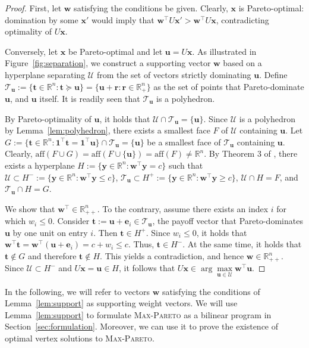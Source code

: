 \documentclass[a4paper, 11pt]{article}
\newcommand{\mc}{\mathcal}
\begin{document}
\begin{proof}
First, let $\bm{w}$ satisfying the conditions be given. Clearly, $\bm{x}$ is Pareto-optimal: domination by some $\bm{x}'$ would imply that $\bm{w}^\top U \bm{x}' > \bm{w}^\top U \bm{x}$, contradicting optimality of $U \bm{x}$.

Conversely, let $\bm{x}$ be Pareto-optimal and let $\bm{u} = U \bm{x}$. As illustrated in Figure~\ref{fig:separation}, we construct a supporting vector $\bm{w}$ based on a hyperplane separating $\mc{U}$ from the set of vectors strictly dominating $\bm{u}$. Define $\mc{T}_{\bm{u}} := \{ \bm{t} \in \mathbb{R}^n : \bm{t} \succeq \bm{u} \} = \{ \bm{u} + \bm{r} : \bm{r} \in \mathbb{R}^{n}_{+}\}$ as the set of points that Pareto-dominate $\bm{u}$, and $\bm{u}$ itself. It is readily seen that $\mc{T}_{\bm{u}}$ is a polyhedron.



By Pareto-optimality of $\bm{u}$, it holds that $\mc{U} \cap \mc{T}_{\bm{u}} = \{ \bm{u} \}$. Since $\mc{U}$ is a polyhedron by Lemma~\ref{lem:polyhedron}, there exists a smallest face $F$ of $\mc{U}$ containing $\bm{u}$. Let $G := \{ \bm{t} \in \mathbb{R}^n : \bm{1}^\top \bm{t} = \bm{1}^\top \bm{u} \} \cap \mc{T}_{\bm{u}} = \{\bm{u} \}$ be a smallest face of $\mc{T}_{\bm{u}}$ containing $\bm{u}$. Clearly, $\text{aff}(F \cup G) = \text{aff}(F \cup \{ \bm{u}\}) = \text{aff}(F) \neq \mathbb{R}^n$. By Theorem 3 of \citep{mclennan2002ordinal}, there exists a hyperplane $H := \{ \bm{y} \in \mathbb{R}^n : \bm{w}^\top \bm{y} = c \}$ such that $\mc{U} \subset H^- :=  \{ \bm{y} \in \mathbb{R}^n : \bm{w}^\top \bm{y} \leq c \}$, $\mc{T}_{\bm{u}} \subset H^+ := \{ \bm{y} \in \mathbb{R}^n : \bm{w}^\top \bm{y} \geq c \}$, $\mc{U} \cap H = F$, and $\mc{T}_{\bm{u}} \cap H = G$.

We show that $\bm{w}^\top \in \mathbb{R}^n_{++}$. To the contrary, assume there exists an index $i$ for which $w_i \leq 0$. Consider $\bm{t} := \bm{u} + \bm{e}_i \in \mc{T}_{\bm{u}}$, the payoff vector that Pareto-dominates $\bm{u}$ by one unit on entry $i$. Then $\bm{t}\in H^+$. Since $w_i \leq 0$, it holds that $\bm{w}^\top \bm{t} = \bm{w}^\top (\bm{u} + \bm{e}_i) = c + w_i \leq c$. Thus, $\bm{t}\in H^-$. At the same time, it holds that $\bm{t} \notin G$ and therefore $\bm{t} \notin H$. 
This yields a contradiction, and hence $\bm{w} \in \mathbb{R}^n_{++}$. Since $\mc{U} \subset H^-$ and $U\bm{x}=\bm{u} \in H$, it follows that $U \bm{x} \in \arg \max\limits_{\bm{u} \in \mc{U}} \bm{w}^\top \bm{u}$.
\end{proof}
In the following, we will refer to vectors $\bm{w}$ satisfying the conditions of Lemma~\ref{lem:support} as supporting weight vectors. We will use Lemma~\ref{lem:support} to formulate \textsc{Max-Pareto} as a bilinear program in Section~\ref{sec:formulation}. Moreover, we can use it to prove the existence of optimal vertex solutions to \textsc{Max-Pareto}.
\end{document}
